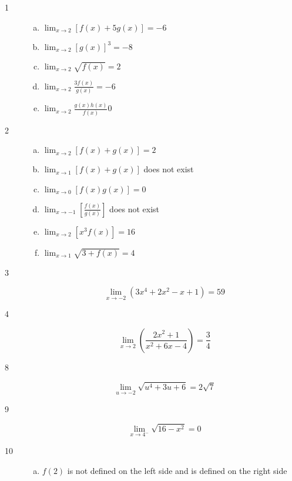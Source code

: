 \documentclass[letterpaper, landscape]{exam}
\begin{document}
    \begin{description}

      \item[1]
        \begin{enumerate}[(a)]
          \item $\lim_{x \to 2} \left[ f(x) + 5g(x) \right] = \boxed{ -6 }$
          \item $\lim_{x \to 2} \left[ g(x) \right]^3 = \boxed{ -8 }$
          \item $\lim_{x \to 2} \sqrt{f(x)} = \boxed{ 2 }$
          \item $\lim_{x \to 2} \frac{3 f(x)}{g(x)} = \boxed{ -6 }$
          \item $\lim_{x \to 2} \frac{g(x) h(x)}{f(x)} \boxed{ 0 }$ 
        \end{enumerate}

      \item[2]
        \begin{enumerate}[(a)]
          \item $\lim_{x \to 2} \left[ f(x) + g(x) \right] = \boxed{ 2 }$
          \item $\lim_{x \to 1} \left[ f(x) + g(x) \right]$ does not exist 
          \item $\lim_{x \to 0} \left[ f(x) g(x) \right] = \boxed{ 0 } $ 
          \item $\lim_{x \to -1} \left[ \frac{f(x)}{g(x)} \right]$ does not exist
          \item $\lim_{x \to 2} \left[ x^3 f(x) \right] = \boxed{ 16 } $ 
          \item $\lim_{x \to 1} \sqrt{3 + f(x)} = \boxed{ 4 }$ 
        \end{enumerate}

      \item[3]
        \[
          \lim_{x \to -2} \left( 3x^4 + 2x^2 - x + 1 \right) = \boxed{ 59 }
        \]

      \item[4]
        \[
          \lim_{x \to 2} \left( \frac{2x^2 + 1}{x^2 + 6x - 4} \right) 
              = \boxed{ \frac{3}{4} }
        \]

      \item[8]
        \[
          \lim_{u \to -2} \sqrt{ u^4 + 3u + 6} = \boxed{ 2 \sqrt{7} }
        \]

      \item[9]
        \[
          \lim_{x \to 4^-} \sqrt{ 16 - x^2 } = \boxed{ 0 }
        \]

      \item[10]
        \begin{enumerate}[(a)]
          \item $f(2)$ is not defined on the left side and is defined on the
            right side


\end{enumerate}
\end{description}
\end{document}
